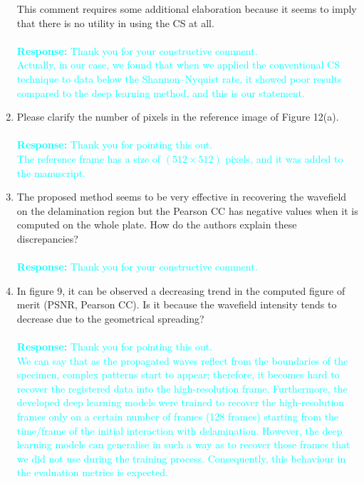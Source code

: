 \documentclass[11pt,a2paper]{report}
\begin{document}
\begin{enumerate}
		This comment requires some additional elaboration because it seems to imply that there is no utility in using the CS at all. 		
		\\	\\
		\textcolor{Cyan}
		{
			\textbf{Response:}
			Thank you for your constructive comment. \\
			Actually, in our case, we found that when we applied the conventional CS technique to data below the Shannon–Nyquist rate, it showed poor results compared to the deep learning method, and this is our statement. 
		} 
		\item Please clarify the number of pixels in the reference image of Figure 12(a). 
		\\ \\
		\textcolor{Cyan}
		{
			\textbf{Response:}
			Thank you for pointing this out. \\
			The reference frame has a size of \((512\times512)\) pixels, and it was added to the manuscript.
		}	
		\item The proposed method seems to be very effective in recovering the wavefield on the delamination region but the Pearson CC has negative values when it is computed on the whole plate. 
		How do the authors explain these discrepancies?
		\\ \\
		\textcolor{Cyan}
		{
			\textbf{Response:}
			Thank you for your constructive comment.\\ 	
		}
		\item In figure 9, it can be observed a decreasing trend in the computed figure of merit (PSNR, Pearson CC). 
		Is it because the wavefield intensity tends to decrease due to the geometrical spreading?
		\\ \\
		\textcolor{Cyan}
		{
			\textbf{Response:}
			Thank you for pointing this out. \\
			We can say that as the propagated waves reflect from the boundaries of the specimen, complex patterns start to appear; therefore, it becomes hard to recover the registered data into the high-resolution frame.
			Furthermore, the developed deep learning models were trained to recover the high-resolution frames only on a certain number of frames (128 frames) starting from the time/frame of the initial interaction with delamination.
			However, the deep learning models can generalise in such a way as to recover those frames that we did not use during the training process.
			Consequently, this behaviour in the evaluation metrics is expected.
		}
	\end{enumerate}
	
\end{document}
